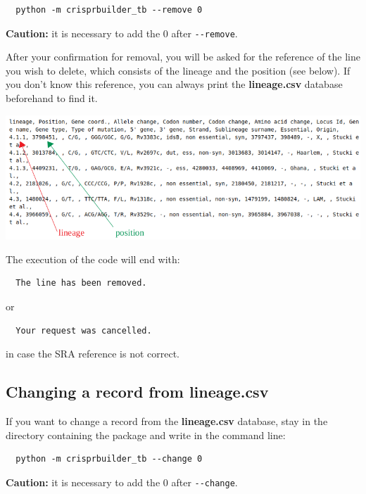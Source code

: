 \documentclass[twoside,a4paper,11pt,frenchb,openany]{report}
\begin{document}
    \begin{verbatim}
  python -m crisprbuilder_tb --remove 0
\end{verbatim}

    \textbf{Caution:} it is necessary to add the 0 after
\texttt{-\/-remove}.

After your confirmation for removal, you will be asked for the reference
of the line you wish to delete, which consists of the lineage and the
position (see below). If you don't know this reference, you can always
print the \textbf{lineage.csv} database beforehand to find it.

\includegraphics[width=16cm]{selection.png}

    The execution of the code will end with:

    \begin{verbatim}
  The line has been removed.
\end{verbatim}

    or

    \begin{verbatim}
  Your request was cancelled.
\end{verbatim}

    in case the SRA reference is not correct.


    \subsection*{Changing a record from
lineage.csv}\label{changing-a-record-from-lineage.csv}

    If you want to change a record from the \textbf{lineage.csv} database,
stay in the directory containing the package and write in the command
line:

    \begin{verbatim}
  python -m crisprbuilder_tb --change 0
\end{verbatim}

    \textbf{Caution:} it is necessary to add the 0 after
\texttt{-\/-change}.
\end{document}
